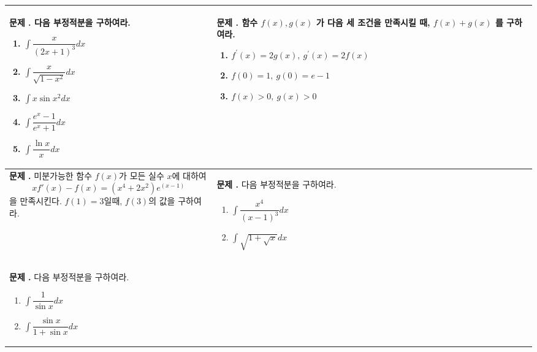 \documentclass[10pt, a4paper]{article} %
\newcounter{probcount}
\newcommand{\exercise}[1]{%
    \stepcounter{probcount}%
    \begin{minipage}[t][110mm][t]{0.44\textwidth}
        \small %
        \vspace{1mm}
        \noindent \textbf{문제 \arabic{probcount}.} #1
    \end{minipage}%
}
\begin{document}
\noindent
\begin{longtable}{p{} | p{}}
    
    \exercise{다음 부정적분을 구하여라.
    \begin{enumerate}[label=(\arabic*), leftmargin=8mm, nosep]
        \item $\displaystyle \int\dfrac{x}{(2x+1)^{3}}dx$
        \item $\displaystyle \int\dfrac{x}{\sqrt{1-x^{2}}}dx$
        \item $\displaystyle \int x\sin x^{2}dx$
        \item $\displaystyle \int\dfrac{e^{x}-1}{e^{x}+1}dx$
        \item $\displaystyle \int\dfrac{\ln x}{x}dx$
    \end{enumerate}} 
    & 
    \exercise{함수 $f(x), g(x)$ 가 다음 세 조건을 만족시킬 때, $f(x)+g(x)$ 를 구하여라.
    \begin{enumerate}[label=(\text{\roman*}), leftmargin=10mm, nosep]
        \item $f^{\prime}(x)=2g(x), \ g^{\prime}(x)=2f(x)$
        \item $f(0)=1, \ g(0)=e-1$
        \item $f(x)>0, \ g(x)>0$
    \end{enumerate}} \\
    \hline %
    
    \exercise{미분가능한 함수 $f(x)$가 모든 실수 $x$에 대하여 
    \[xf'(x)-f(x)=(x^4+2x^2)e^(x-1)\]을 만족시킨다. $f(1)=3$일때, $f(3)$의 값을 구하여라.} 
    & 
    \exercise{다음 부정적분을 구하여라.
    \begin{enumerate}[label=(\arabic*), leftmargin=8mm, nosep]
        \item $\displaystyle \int\dfrac{x^{4}}{(x-1)^{3}}dx$
        \item $\displaystyle \int\sqrt{1+\sqrt{x}}dx$
    \end{enumerate}} 
    \\ 

    \exercise{다음 부정적분을 구하여라.
    \begin{enumerate}[label=(\arabic*), leftmargin=8mm, nosep]
        \item $\displaystyle \int\dfrac{1}{\sin x}dx$
        \item $\displaystyle \int\dfrac{\sin x}{1+\sin x}dx$
    \end{enumerate}}
    &


\end{longtable}
\end{document}
